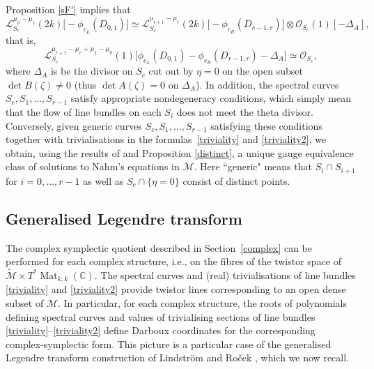 \documentclass[10pt,a4paper]{amsart}
\newcommand{\cx}{{\mathbb C}}
\newcommand{\Mat}{\operatorname{Mat}}
\numberwithin{equation}{section}
\newcommand{\sM}{{\mathcal{M}}} %
\newcommand{\sO}{{\mathcal{O}}}
\begin{document}
{ Proposition \ref{sF'} implies that
\[
\mathscr{L}_{S_c}^{\mu_0-\mu_1}(2k)\bigl[-\phi_{c_L} (D_{0,1} )\bigr]\simeq \mathscr{L}_{S_c}^{\mu_{r+1}-\mu_r}(2k)\bigl[-\phi_{c_R} (D_{r-1,r} )\bigr]\otimes \sO_{S_c}(1)[-\Delta_A],
\]
that is,
 \begin{equation} \mathscr{L}_{S_c}^{\mu_{r+1}-\mu_r+\mu_1-\mu_0}(1)\bigl[\phi_{c_L} (D_{0,1} )-\phi_{c_R} (D_{r-1,r} )-\Delta_A\bigr]\simeq \sO_{S_c},\label{triviality2}
 \end{equation}
 where $\Delta_A$ is be the divisor on $S_c$ cut out by $\eta=0$ on the open subset $\det B(\zeta)\neq 0$ (thus $\det A(\zeta)=0$ on $\Delta_A$).
In addition, the spectral curves $S_c,S_1,\dots, S_{r-1}$ satisfy appropriate nondegeneracy conditions, which simply mean that the flow of line bundles on each $S_i$ does not meet the theta divisor. Conversely, given generic curves $S_c,S_1,\dots, S_{r-1}$ satisfying these conditions together with trivialisations in the formulas~\eqref{triviality} and \eqref{triviality2}, we obtain, using the results of \cite{HM} and Proposition \ref{distinct}, a unique gauge equivalence class of solutions to Nahm's equations in $\sM$. Here ``generic" means that $S_i \cap S_{i+1}$ for $i=0,\dots,r-1$ as well as $S_c\cap \{\eta=0\}$ consist of distinct points.

 \subsection{Generalised Legendre transform}
 The complex symplectic quotient described in Section~\ref{complex} can be performed for each complex structure, i.e., on the fibres of the twistor space of $\tilde \sM\times T^\ast \Mat_{k,k}(\cx)$. The spectral curves and (real) trivialisations of line bundles \eqref{triviality} and \eqref{triviality2} provide twistor lines corresponding to an open dense subset of $\sM$. In particular, for each complex structure, the roots of polynomials defining spectral curves and values of trivialising sections of line bundles \eqref{triviality}--\eqref{triviality2} define Darboux coordinates for the corresponding complex-symplectic form. This picture is a particular case of the generalised Legendre transform construction of Lindstr\"om and Ro\v{c}ek \cite{HKLR,LR}, which we now recall.

}
\end{document}
